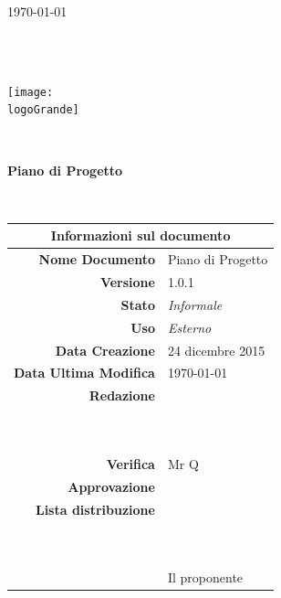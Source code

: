 \documentclass[12pt,a4paper]{article}
\title{\titoloDocumento}
\newcommand{\titoloDocumento}{Piano di Progetto}
\newcommand{\dataCreazione}{24 dicembre 2015}
\newcommand{\versione}{1.0.1}
\newcommand{\stato}{Informale}
\newcommand{\uso}{Esterno}
\begin{document}
\begin{titlepage}
\begin{center}
\today \\
\vspace{1cm}
\begin{Huge}
\textbf{\nomeGruppo} \\
\end{Huge}
\textbf{\prjL} \\
\vspace{1cm}
\texttt{[image: \\logoGrande]}
\vspace{1cm}

\HRule \\[0.4cm]
\begin{Huge}
{\huge \bfseries \titoloDocumento}\\[0.4cm]
\end{Huge}
\HRule \\[1cm]
\vfill

\begin{table}[h]
\begin{center}
\begin{tabular}{r | l}
\multicolumn{2}{c}{\textbf{Informazioni sul documento}}\\
\midrule
\textbf{Nome Documento}	&	\titoloDocumento	\\
\textbf{Versione}	&	\versione	\\
\textbf{Stato}	&	\emph{\stato}	\\
\textbf{Uso}	&	\emph{\uso}	\\
\textbf{Data Creazione}	&	\dataCreazione	\\
\textbf{Data Ultima Modifica}	&	\today	\\
\textbf{Redazione}	& \NDC \\
\ 	& \TP \\
\ 	& \IB \\
\textbf{Verifica}	&	Mr Q	\\
\textbf{Approvazione}	& \NDC \\
\textbf{Lista distribuzione}	&	\nomeGruppo	\\
\ 	&	\Vardanega	\\
\ 	&	\Cardin	\\
\ 	&	Il proponente \Zucchetti	\\

\end{tabular}
\end{center}
\end{table}

\end{center}
\end{titlepage}
\newpage
\end{document}
